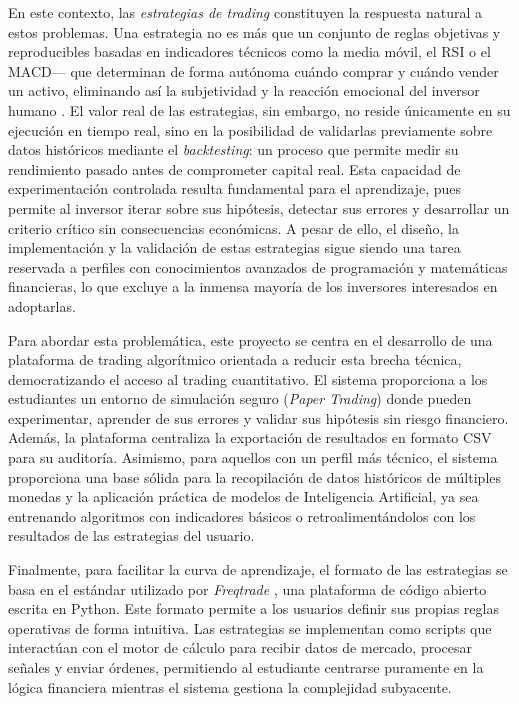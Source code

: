 En este contexto, las \textit{estrategias de trading} constituyen la respuesta natural a estos problemas. Una estrategia no es más que un conjunto de reglas objetivas y reproducibles basadas en indicadores técnicos como la media móvil, el RSI o el MACD— que determinan de forma autónoma cuándo comprar y cuándo vender un activo, eliminando así la subjetividad y la reacción emocional del inversor humano \parencite{murphy_technical_1999}. El valor real de las estrategias, sin embargo, no reside únicamente en su ejecución en tiempo real, sino en la posibilidad de validarlas previamente sobre datos históricos mediante el \textit{backtesting}: un proceso que permite medir su rendimiento pasado antes de comprometer capital real. Esta capacidad de experimentación controlada resulta fundamental para el aprendizaje, pues permite al inversor iterar sobre sus hipótesis, detectar sus errores y desarrollar un criterio crítico sin consecuencias económicas. A pesar de ello, el diseño, la implementación y la validación de estas estrategias sigue siendo una tarea reservada a perfiles con conocimientos avanzados de programación y matemáticas financieras, lo que excluye a la inmensa mayoría de los inversores interesados en adoptarlas.

Para abordar esta problemática, este proyecto se centra en el desarrollo de una plataforma de trading algorítmico orientada a reducir esta brecha técnica, democratizando el acceso al trading cuantitativo. El sistema proporciona a los estudiantes un entorno de simulación seguro (\textit{Paper Trading}) donde pueden experimentar, aprender de sus errores y validar sus hipótesis sin riesgo financiero. Además, la plataforma centraliza la exportación de resultados en formato CSV para su auditoría. Asimismo, para aquellos con un perfil más técnico, el sistema proporciona una base sólida para la recopilación de datos históricos de múltiples monedas y la aplicación práctica de modelos de Inteligencia Artificial, ya sea entrenando algoritmos con indicadores básicos o retroalimentándolos con los resultados de las estrategias del usuario.

Finalmente, para facilitar la curva de aprendizaje, el formato de las estrategias se basa en el estándar utilizado por \textit{Freqtrade} \parencite{freqtrade_development_team_freqtrade_2023}, una plataforma de código abierto escrita en Python. Este formato permite a los usuarios definir sus propias reglas operativas de forma intuitiva. Las estrategias se implementan como scripts que interactúan con el motor de cálculo para recibir datos de mercado, procesar señales y enviar órdenes, permitiendo al estudiante centrarse puramente en la lógica financiera mientras el sistema gestiona la complejidad subyacente.

